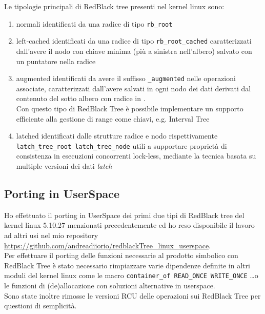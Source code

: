 \voidLine
Le tipologie principali di RedBlack tree presenti nel kernel linux sono:
\begin{enumerate}
	\item normali  		identificati da una radice di tipo \verb|rb_root|
	\item left-cached 	identificati da una radice di tipo \verb|rb_root_cached|
		caratterizzati dall'avere il nodo con chiave minima (più a sinistra nell'albero) salvato con un puntatore nella radice
	\item augmented		identificati da avere il suffisso \verb|_augmented| nelle operazioni associate,
		caratterizzati dall'avere salvati in ogni nodo  dei dati derivati dal contenuto del sotto albero con radice in .\\
		Con questo tipo di RedBlack Tree è possibile implementare un supporto efficiente alla gestione di range come chiavi,
		e.g. Interval Tree \cite{rbtree.rst,algoIntro}
	\item latched		identificati dalle strutture radice e nodo rispettivamente \verb|latch_tree_root latch_tree_node|
		utili a supportare proprietà di consistenza in esecuzioni concorrenti lock-less,
		mediante la tecnica basata su multiple versioni dei dati \emph{latch}
\end{enumerate}

\subsection{Porting in UserSpace}
Ho effettuato il porting in UserSpace dei primi due tipi di RedBlack tree del kernel linux 5.10.27 menzionati precedentemente 
ed ho reso disponibile il lavoro ad altri usi nel mio repository \url{https://github.com/andreadiiorio/redblackTree_linux_userspace}.\\
Per effettuare il porting delle funzioni necessarie al prodotto simbolico con RedBlack Tree è stato necessario 
rimpiazzare varie dipendenze definite in altri moduli del kernel linux come 
le macro \verb|container_of READ_ONCE WRITE_ONCE| \dots  o le funzioni di (de)allocazione
con soluzioni alternative in userspace.\\Sono state inoltre rimosse le versioni RCU delle operazioni sui RedBlack Tree per questioni di semplicità. 

